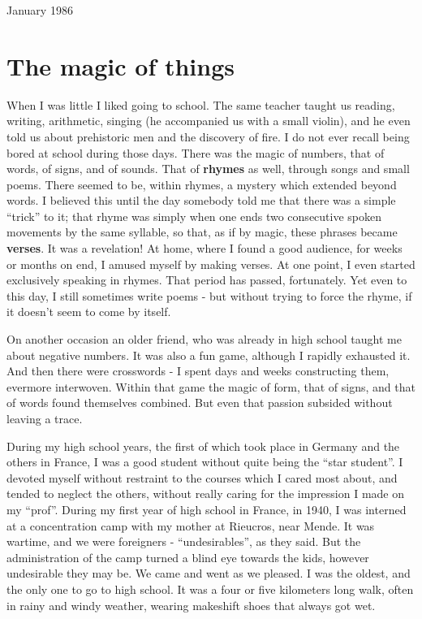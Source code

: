 \begin{comment}
\documentclass{book}
\usepackage{master}
\newcommand{\rec}{$\text{R\'ecoltes et Semailles}$}
\newcommand{\no}{n$^\circ$}
\hfuzz = 100pt

\end{comment}


January 1986

\section{The magic of things}

When I was little I liked going to school. The same teacher taught us reading,
writing, arithmetic, singing (he accompanied us with a small violin), and he even told us about prehistoric men and the discovery of fire.
I do not ever recall being bored at school during those days.
There was the magic of numbers, that of words, of signs, and of sounds.
That of \textbf{rhymes} as well, through songs and small poems. 
There seemed to be, within rhymes, a mystery which extended beyond words.
I believed this until the day somebody told me that there was a simple ``trick'' to it;
that rhyme was simply when one ends
two consecutive spoken movements by the same syllable, so that, as if by magic, these
phrases became \textbf{verses}. It was a revelation! 
At home, where I found a good audience, for weeks or months on end, I amused myself by
making verses. At one point, I even started exclusively speaking in rhymes. 
That period has passed, fortunately. 
Yet even to this day, I still sometimes write poems - but without trying to force the
rhyme, if it doesn't seem to come by itself. 

On another occasion an older friend, who was already in high school taught me about
negative numbers. It was also a fun game, although I rapidly exhausted it. 
And then there were crosswords - I spent days and weeks constructing them, evermore
interwoven. Within that game the magic of form, that of signs, and that of words found
themselves combined. But even that passion subsided without leaving a trace. 

During my high school years, the first of which took place in Germany and the others in
France, I was a good student without quite being the ``star student''.
I devoted myself without restraint to the
courses which I cared most about, and tended to neglect the others, without really caring
for the impression I made on my ``prof''. 
During my first year of high school in France, in 1940, I was interned at a concentration
camp with my mother at Rieucros, near Mende. It was wartime, and we were foreigners -
``undesirables'', as they said. But the administration of the camp turned a blind eye
towards the kids, however undesirable they may be. We came and went as we pleased. 
I was the oldest, and the only one to go to high school. It was a four or five kilometers long walk, often in rainy and windy weather, wearing makeshift shoes 
that always got wet. 

